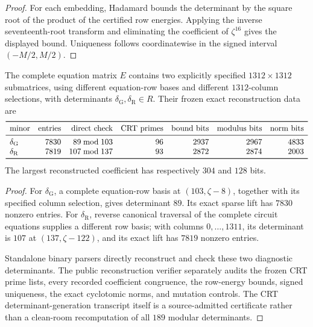 \begin{proof}
For each embedding, Hadamard bounds the determinant by the square root of
the product of the certified row energies.  Applying the inverse
seventeenth-root transform and eliminating the coefficient of
\(\zeta^{16}\) gives the displayed bound.  Uniqueness follows
coordinatewise in the signed interval \((-M/2,M/2)\).
\end{proof}

\begin{proposition}
\label{prop:two-exact-minors}
The complete equation matrix \(E\) contains two explicitly specified
\(1312\times1312\) submatrices, using different equation-row bases and
different \(1312\)-column selections, with determinants
\(\delta_{\mathrm G},\delta_{\mathrm R}\in R\).  Their frozen exact
reconstruction data are
\[
\begin{array}{lrrrrrr}
\toprule
\text{minor}&\text{entries}&\text{direct check}&\text{CRT primes}&
\text{bound bits}&\text{modulus bits}&\text{norm bits}\\
\midrule
\delta_{\mathrm G}&7830&89\bmod103&96&2937&2967&4833\\
\delta_{\mathrm R}&7819&107\bmod137&93&2872&2874&2003\\
\bottomrule
\end{array}
\]
The largest reconstructed coefficient has respectively \(304\) and
\(128\) bits.
\end{proposition}

\begin{proof}
For \(\delta_{\mathrm G}\), a complete equation-row basis at
\((103,\zeta-8)\), together with its specified column selection, gives
determinant \(89\).  Its exact sparse lift has \(7830\) nonzero entries.
For \(\delta_{\mathrm R}\), reverse canonical traversal of the complete
circuit equations supplies a different row basis; with columns
\(0,\ldots,1311\), its determinant is \(107\) at
\((137,\zeta-122)\), and its exact lift has \(7819\) nonzero entries.

Standalone binary parsers directly reconstruct and check these two
diagnostic determinants.  The public reconstruction verifier separately
audits the frozen CRT prime lists, every recorded coefficient
congruence, the row-energy bounds, signed uniqueness, the exact
cyclotomic norms, and mutation controls.  The CRT determinant-generation
transcript itself is a source-admitted certificate rather than a
clean-room recomputation of all \(189\) modular determinants.
\end{proof}


